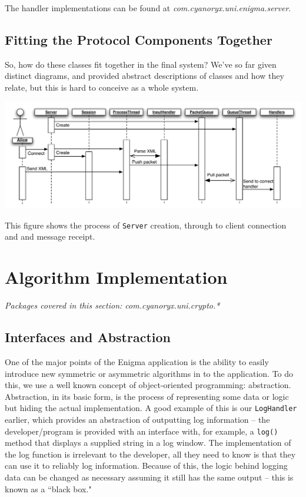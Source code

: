     The handler implementations can be found at \emph{com.cyanoryx.uni.enigma.server}.
    
    \subsection{Fitting the Protocol Components Together}
    \label{subsec:combined}
    
    So, how do these classes fit together in the final system? We've so far given distinct diagrams, and provided abstract descriptions of classes and how they relate, but this is hard to conceive as a whole system.
    
    \begin{center}
      \includegraphics[scale=0.5]{./Figures/Ch6/6-4-5.pdf}
    \end{center}
    
    This figure shows the process of \verb!Server! creation, through to client connection and and message receipt.

\section{Algorithm Implementation}
  \emph{Packages covered in this section: com.cyanoryx.uni.crypto.*}
  
  \subsection{Interfaces and Abstraction}
  
  One of the major points of the Enigma application is the ability to easily introduce new symmetric or asymmetric algorithms in to the application. To do this, we use a well known concept of object-oriented programming: abstraction. Abstraction, in its basic form, is the process of representing some data or logic but hiding the actual implementation. A good example of this is our \verb!LogHandler! earlier, which provides an abstraction of outputting log information -- the developer/program is provided with an interface with, for example, a \verb!log()! method that displays a supplied string in a log window. The implementation of the log function is irrelevant to the developer, all they need to know is that they can use it to reliably log information. Because of this, the logic behind logging data can be changed as necessary assuming it still has the same output -- this is known as a ``black box."
  
